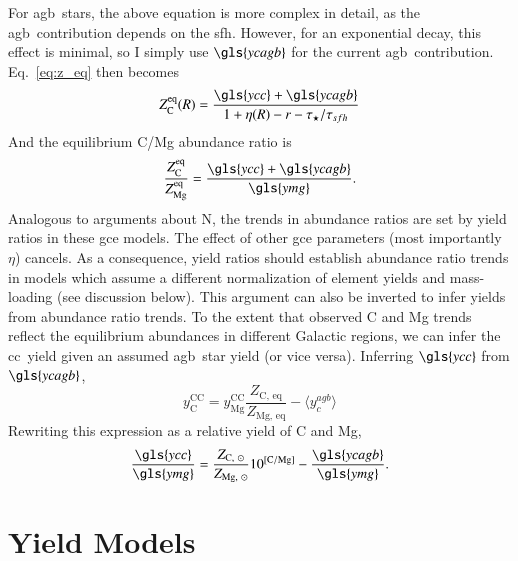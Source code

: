 \documentclass[12pt,oneside,letterpaper]{report}
\newcommand{\cc}{\gls{cc}}
\newcommand{\agb}{\gls{agb}}
\newcommand{\sfh}{\gls{sfh}}
\newcommand{\gce}{\gls{gce}}
\newcommand{\Ycc}{\gls{ycc}}
\newcommand{\Yoc}{\gls{ymg}}
\newcommand{\Ycagb}{\gls{ycagb}}
\begin{document}
For \agb\ stars, the above equation is more complex in detail, as the \agb\ contribution depends on the \sfh. However, for an exponential decay, this effect is minimal, so I simply use $\Ycagb$ for the current \agb\ contribution.
Eq.~\ref{eq:z_eq} then becomes
\begin{equation}
    Z_{\rm C}^{\rm eq}(R) = \frac{\Ycc + \Ycagb}{1 + \eta(R) - r - \tau_\star / \tau_{sfh}}
\end{equation}
And the equilibrium C/Mg abundance ratio is
\begin{equation}\label{eq:z_co}
    \frac{Z_{\rm C}^{\rm eq}}{Z_{\rm Mg}^{\rm eq}} = \frac{\Ycc + \Ycagb }{\Yoc}.
\end{equation}
Analogous to \cite{james+23} arguments about N, the trends in abundance ratios are set by yield ratios in these \gce{} models. The effect of other \gce{} parameters (most importantly $\eta$) cancels. As a consequence, yield ratios should establish abundance ratio trends in models which assume a different normalization of element yields and mass-loading (see discussion below).
This argument can also be inverted to infer  yields from abundance ratio trends. To the extent that observed C and Mg trends reflect the equilibrium abundances in different Galactic regions, we can infer the \cc\ yield given an assumed \agb\ star yield (or vice versa). Inferring $\Ycc$ from $\Ycagb$, 
\begin{equation}
    y_\text{C}^\text{CC} =  y_\text{Mg}^\text{CC} \frac{Z_\text{C,~eq}}{Z_\text{Mg,~eq}} - \langle y_c^{agb} \rangle
\end{equation}
Rewriting this expression as a relative yield of C and Mg,
\begin{equation}\label{eq:y_c_eq}
    \frac{\Ycc}{\Yoc} = \frac{Z_{\text{C},~\odot}}{Z_{\text{Mg},~\odot}} 10^{\rm [C/Mg]} - \frac{\Ycagb}{\Yoc}.
\end{equation}

\section{Yield Models}
\end{document}
